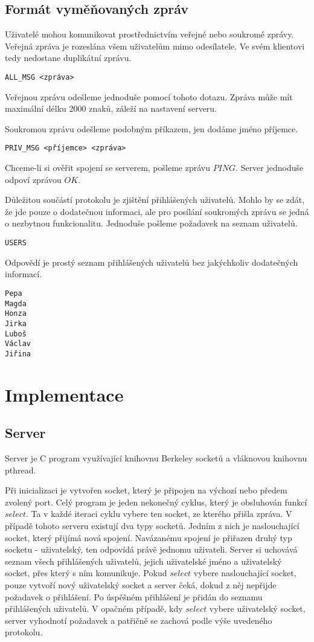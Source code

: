 \documentclass[12pt,titlepage]{article}
\begin{document}
\subsection{Formát vyměňovaných zpráv}
Uživatelé mohou komunikovat prostřednictvím veřejné nebo soukromé zprávy.
Veřejná zpráva je rozeslána všem uživatelům mimo odesílatele. Ve svém klientovi
tedy nedostane duplikátní zprávu.
\begin{verbatim}
ALL_MSG <zpráva>
\end{verbatim}
Veřejnou zprávu odešleme jednoduše pomocí tohoto dotazu. Zpráva může mít
maximální délku 2000 znaků, záleží na nastavení serveru.

Soukromou zprávu odešleme podobným příkazem, jen dodáme jméno příjemce.
\begin{verbatim}
PRIV_MSG <příjemce> <zpráva>
\end{verbatim}

Chceme-li si ověřit spojení se serverem, pošleme zprávu $PING$. Server jednoduše
odpoví zprávou $OK$.

Důležitou součástí protokolu je zjištění přihlášených uživatelů. Mohlo by se
zdát, že jde pouze o dodatečnou informaci, ale pro posílání soukromých zprávu
se jedná o nezbytnou funkcionalitu. Jednoduše pošleme požadavek na seznam uživatelů.

\begin{verbatim}
USERS
\end{verbatim}

Odpovědí je prostý seznam přihlášených uživatelů bez jakýchkoliv dodatečných
informací.
\begin{verbatim}
Pepa
Magda
Honza
Jirka
Luboš
Václav
Jiřina
\end{verbatim}

\section{Implementace} %
\subsection{Server}
Server je C program využívající knihovnu Berkeley socketů a vláknovou knihovnu
pthread. 

Při inicializaci je vytvořen socket, který je připojen na výchozí nebo předem
zvolený port. Celý program je jeden nekonečný cyklus, který je obsluhován
funkcí $select$. Ta v každé iteraci cyklu vybere ten socket, ze kterého přišla
zpráva. V případě tohoto serveru existují dva typy socketů. Jedním z nich je
naslouchající socket, který přijímá nová spojení. Navázanému spojení je
přiřazen druhý typ socketu - uživatelský, ten odpovídá právě jednomu uživateli.
Server si uchovává seznam všech přihlášených uživatelů, jejich uživatelské
jméno a uživatelský socket, přes který s ním komunikuje. Pokud $select$ vybere
naslouchající socket, pouze vytvoří nový uživatelský socket a server čeká,
dokud z něj nepřijde požadavek o přihlášení. Po úspěšném přihlášení je přidán
do seznamu přihlášených uživatelů. V opačném případě, kdy $select$ vybere
uživatelský socket, server vyhodnotí požadavek a patřičně se zachová podle výše
uvedeného protokolu.
\end{document}
